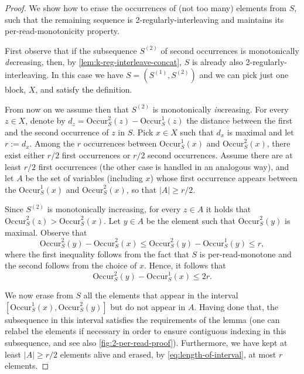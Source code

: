 \documentclass[11pt]{article}
\newcommand{\occur}[3]{\mathrm{Occur}_{#1}^{#2}({#3})}
\begin{document}
\begin{proof}%
We show how to erase the occurrences of (not too many) elements from $S$, such that the remaining sequence is 2-regularly-interleaving and maintains its per-read-monotonicity property.

First observe that if the subsequence $S^{(2)}$ of second occurrences is monotonically \emph{de}creasing, then, by \autoref{lem:k-reg-interleave-concat}, $S$ is already also 2-regularly-interleaving. In this case we have $S=(S^{(1)}, S^{(2)})$ and we can pick just one block, $X$, and satisfy the definition.

From now on we assume then that $S^{(2)}$ is monotonically \emph{in}creasing.
For every $z \in X$, denote by $d_z =  \occur{S}{2}{z} -  \occur{S}{1}{z}$ the distance between the first and the second occurrence of $z$ in $S$. Pick $x \in X$ such that $d_x$ is maximal and let $r:=d_x$. Among the $r$ occurrences between $\occur{S}{1}{x}$ and $\occur{S}{2}{x}$, there exist either $r/2$ first occurrences or $r/2$ second occurrences. Assume there are at least $r/2$ first occurrences (the other case is handled in an analogous way), and let $A$ be the set of variables (including $x$) whose first occurrence appears between the $\occur{S}{1}{x}$ and $\occur{S}{2}{x}$, so that $|A| \ge r/2$.

Since $S^{(2)}$ is monotonically increasing, for every $z \in A$ it holds that $\occur{S}{2}{z} > \occur{S}{2}{x}$. Let $y \in A$ be the element such that $\occur{S}{2}{y}$ is maximal. Observe that
\[
\occur{S}{2}{y} - \occur{S}{2}{x} \le \occur{S}{2}{y} - \occur{S}{1}{y} \le r,
\]
where the first inequality follows from the fact that $S$ is per-read-monotone and the second follows from the choice of $x$. Hence, it follows that
\begin{equation}
\label{eq:length-of-interval}
\occur{S}{2}{y} - \occur{S}{1}{x} \le 2r.
\end{equation}

We now erase from $S$ all the elements that appear in the interval $[ \occur{S}{1}{x} , \occur{S}{2}{y}]$ but do not appear in $A$.
Having done that, the subsequence in this interval satisfies the requirements of the lemma (one can relabel the elements if necessary in order to ensure contiguous indexing in this subsequence, and see also \autoref{fig:2-per-read-proof}). Furthermore, we have kept at least $|A| \ge r/2$ elements alive and erased, by \eqref{eq:length-of-interval}, at most $r$ elements.


\end{proof}
\end{document}
